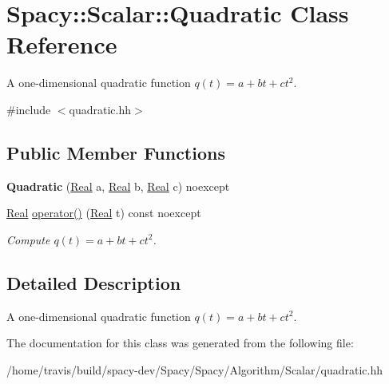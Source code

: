 \hypertarget{classSpacy_1_1Scalar_1_1Quadratic}{\section{Spacy\-:\-:Scalar\-:\-:Quadratic Class Reference}
\label{classSpacy_1_1Scalar_1_1Quadratic}
}


A one-\/dimensional quadratic function $q(t) = a + bt + ct^2$.  




{\ttfamily \#include $<$quadratic.\-hh$>$}

\subsection*{Public Member Functions}
\begin{DoxyCompactItemize}
\item 
\hypertarget{classSpacy_1_1Scalar_1_1Quadratic_a350f7d637e9cb093a6dee091f138edfb}{{\bfseries Quadratic} (\hyperlink{classSpacy_1_1Real}{Real} a, \hyperlink{classSpacy_1_1Real}{Real} b, \hyperlink{classSpacy_1_1Real}{Real} c) noexcept}\label{classSpacy_1_1Scalar_1_1Quadratic_a350f7d637e9cb093a6dee091f138edfb}

\item 
\hypertarget{classSpacy_1_1Scalar_1_1Quadratic_a0289f0fe37afe6d44465975c44fae80d}{\hyperlink{classSpacy_1_1Real}{Real} \hyperlink{classSpacy_1_1Scalar_1_1Quadratic_a0289f0fe37afe6d44465975c44fae80d}{operator()} (\hyperlink{classSpacy_1_1Real}{Real} t) const noexcept}\label{classSpacy_1_1Scalar_1_1Quadratic_a0289f0fe37afe6d44465975c44fae80d}

\begin{DoxyCompactList}\small\item\em Compute $q(t) = a + bt + ct^2 $. \end{DoxyCompactList}\end{DoxyCompactItemize}


\subsection{Detailed Description}
A one-\/dimensional quadratic function $q(t) = a + bt + ct^2$. 

The documentation for this class was generated from the following file\-:\begin{DoxyCompactItemize}
\item 
/home/travis/build/spacy-\/dev/\-Spacy/\-Spacy/\-Algorithm/\-Scalar/quadratic.\-hh\end{DoxyCompactItemize}
